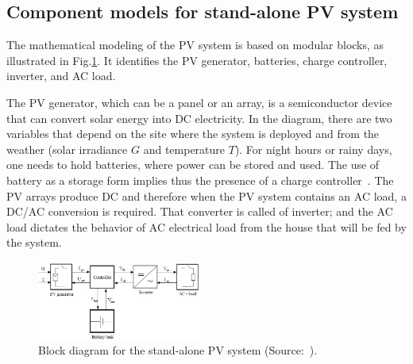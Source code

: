 \documentclass[journal]{IEEEtran}
\begin{document}
\subsection{Component models for stand-alone PV system }

The mathematical modeling of the PV system is based on modular blocks, as illustrated in Fig.\ref{fig:blockdiagram}. It identifies the PV generator, batteries, charge controller, inverter, and AC load. 

The PV generator, which can be a panel or an array, is a semiconductor device that can convert solar energy into DC electricity. In the diagram, there are two variables that depend on the site where the system is deployed and from the weather (solar irradiance $G$ and temperature $T$). For night hours or rainy days, one needs to hold batteries, where power can be stored and used. The use of battery as a storage form implies thus the presence of a charge controller~\cite{Hansen,Mellit}. The PV arrays produce DC and therefore when the PV system contains an AC load, a DC/AC conversion is required. That converter is called of inverter; and the AC load dictates the behavior of AC electrical load from the house that will be fed by the system.
%
%
\begin{figure}[h]
\includegraphics[width=0.48\textwidth]{blockdiagramPVS}
\centering
\caption{Block diagram for the stand-alone PV system (Source:~\cite{Hansen}).}
\label{fig:blockdiagram}
\end{figure}


\end{document}
